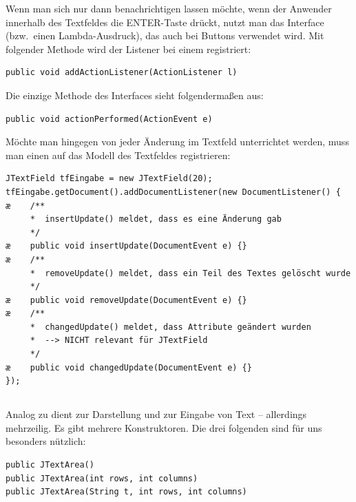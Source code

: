 \begin{compactenum}[a)]
\item Wenn man sich nur dann benachrichtigen lassen möchte, wenn der Anwender
innerhalb des Textfeldes die ENTER-Taste drückt, nutzt man das Interface
 (bzw.\ einen Lambda-Ausdruck), das auch bei Buttons
verwendet wird. Mit folgender Methode wird der Listener bei einem
 registriert:

\begin{lstlisting}
public void addActionListener(ActionListener l)
\end{lstlisting}

Die einzige Methode des Interfaces  sieht folgendermaßen
aus:

\begin{lstlisting}
public void actionPerformed(ActionEvent e)
\end{lstlisting}

\item Möchte man hingegen von jeder Änderung im Textfeld unterrichtet werden,
muss man einen  auf das Modell des Textfeldes
registrieren:

\begin{lstlisting}
JTextField tfEingabe = new JTextField(20);
tfEingabe.getDocument().addDocumentListener(new DocumentListener() {
æ    /**
     *  insertUpdate() meldet, dass es eine Änderung gab
     */
æ    public void insertUpdate(DocumentEvent e) {}
æ    /**
     *  removeUpdate() meldet, dass ein Teil des Textes gelöscht wurde
     */
æ    public void removeUpdate(DocumentEvent e) {}
æ    /**
     *  changedUpdate() meldet, dass Attribute geändert wurden
     *  --> NICHT relevant für JTextField
     */
æ    public void changedUpdate(DocumentEvent e) {}
});
\end{lstlisting}
\end{compactenum}

\subsection{}

Analog zu  dient  zur Darstellung und zur
Eingabe von Text -- allerdings mehrzeilig. Es gibt mehrere Konstruktoren. Die
drei folgenden sind für uns besonders nützlich:

\begin{lstlisting}
public JTextArea()
public JTextArea(int rows, int columns)
public JTextArea(String t, int rows, int columns)
\end{lstlisting}

